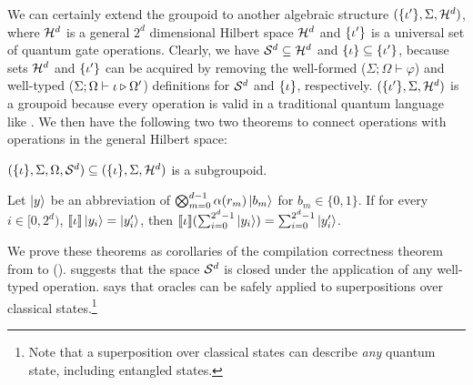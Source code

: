 We can certainly extend the groupoid to another algebraic structure $(\{\iota'\},\Sigma,\mathcal{H}^d)$, where $\mathcal{H}^d$ is a general $2^d$ dimensional Hilbert space $\mathcal{H}^d$ and $\{\iota'\}$ is a universal set of quantum gate operations.
Clearly, we have $\mathcal{S}^d \subseteq \mathcal{H}^d$ and $\{\iota\} \subseteq \{\iota'\}$, because sets $\mathcal{H}^d$ and $\{\iota'\}$ can be acquired by removing the well-formed ($\Sigma;\Omega \vdash \varphi$) and well-typed ($\Sigma;\Omega \vdash \iota \triangleright \Omega'$) definitions for $\mathcal{S}^d$ and $\{\iota\}$, respectively.
$(\{\iota'\},\Sigma,\mathcal{H}^d)$ is a groupoid because every \oqasm operation is valid in a traditional quantum language like \sqir. We then have the following two two theorems to connect \oqasm operations with operations in the general Hilbert space: 

 \begin{theorem}\label{thm:subgroupoid}\rm
   $(\{\iota\},\Sigma, \Omega,\mathcal{S}^d) \subseteq (\{\iota\},\Sigma,\mathcal{H}^d)$ is a subgroupoid.
 \end{theorem}

\begin{theorem}\label{thm:sem-same}\rm
Let $\left\vert{y}\right\rangle$ be an abbreviation of $\bigotimes_{m=0}^{d-1} \alpha(r_m) \left\vert{b_m}\right\rangle$ for $b_m \in \{0,1\}$.
If for every $i\in [0,2^d)$, $\llbracket \iota \rrbracket\left\vert{y_i}\right\rangle=\left\vert{y'_i}\right\rangle$, then $\llbracket \iota \rrbracket (\sum_{i=0}^{2^d-1} \left\vert{y_i}\right\rangle)=\sum_{i=0}^{2^d-1} \left\vert{y'_i}\right\rangle$.
\end{theorem}

We prove these theorems as corollaries of the compilation correctness theorem from \oqasm to \sqir (). 
 suggests that the space $\mathcal{S}^d$ is closed under the application of any well-typed \oqasm operation.
 says that \oqasm oracles can be safely applied to superpositions over classical states.\footnote{Note that a superposition over classical states can describe \emph{any} quantum state, including entangled states.}

